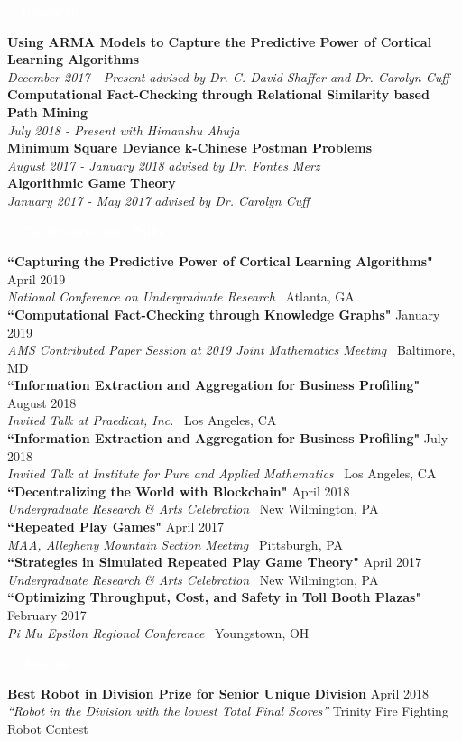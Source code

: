 \documentclass[letterpaper,11pt]{article}
\newcommand{\resheading}[1]{{\vspace{2pt}\large \colorbox{electricpurple}{\begin{minipage}{\textwidth}{\textbf{#1 \vphantom{p\^{E}}}}\end{minipage}}}\vspace{3pt}}
\newcommand{\Talk}[4]{
	\textbf{#1} \hfill #2 \\
	\textit{#3} \hfill \faMapMarker \ #4 \\
}
\newcommand{\Research}[3]{
	\textbf{#1}\\
	\textit{#2} \hfill \textit{#3} \\
}
\newcommand{\Award}[4]{
	\textbf{#1} \hfill #2 \\
	\textit{``#3''} \hfill #4 \\
}
\begin{document}
	\resheading{\textcolor{white}{\ \faBook \ Research}}
	
	\Research{Using ARMA Models to Capture the Predictive Power of Cortical Learning Algorithms}{December 2017 - Present}{advised by Dr. C. David Shaffer and Dr. Carolyn Cuff}

	\Research{Computational Fact-Checking through Relational Similarity based Path Mining}{July 2018 - Present}{with Himanshu Ahuja}
	
	\Research{Minimum Square Deviance k-Chinese Postman Problems}{August 2017 - January 2018}{advised by Dr. Fontes Merz}
	
	\Research{Algorithmic Game Theory}{January 2017 - May 2017}{advised by Dr. Carolyn Cuff}

	
		\resheading{\textcolor{white}{\ \faChalkboardTeacher \ Conferences and Talks}}
		
		\Talk{``Capturing the Predictive Power of Cortical Learning Algorithms"}{April 2019}{National Conference on Undergraduate Research}{Atlanta, GA}
		
		\Talk{``Computational Fact-Checking through Knowledge Graphs"}{January 2019}{AMS Contributed Paper Session at 2019 Joint Mathematics Meeting}{Baltimore, MD}
		
		\Talk{``Information Extraction and Aggregation for Business Profiling"}{August 2018}{Invited Talk at Praedicat, Inc.}{Los Angeles, CA}
		
		\Talk{``Information Extraction and Aggregation for Business Profiling"}{July 2018}{Invited Talk at Institute for Pure and Applied Mathematics}{Los Angeles, CA}
		
		\Talk{``Decentralizing the World with Blockchain"}{April 2018}{Undergraduate Research \& Arts Celebration}{New Wilmington, PA}
		
		\Talk{``Repeated Play Games"}{April 2017}{MAA, Allegheny Mountain Section Meeting}{Pittsburgh, PA}
		
		\Talk{``Strategies in Simulated Repeated Play Game Theory"}{April 2017}{Undergraduate Research \& Arts Celebration}{New Wilmington, PA}
		
		\Talk{``Optimizing Throughput, Cost, and Safety in Toll Booth Plazas"}{February 2017}{Pi Mu Epsilon Regional Conference}{Youngstown, OH}

	\pagebreak

	\resheading{\textcolor{white}{\ \faAward \ Awards}}

		\Award{Best Robot in Division Prize for Senior Unique Division}{April 2018}{Robot in the Division with the lowest Total Final Scores}{Trinity Fire Fighting Robot Contest}
\end{document}
